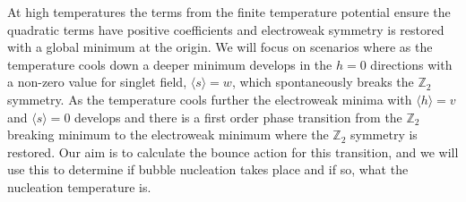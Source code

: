 \documentclass[final,3p,11pt,pdflatex]{elsarticle}
\begin{document}
At high temperatures the terms from the finite temperature potential
ensure the quadratic terms have positive coefficients and electroweak
symmetry is restored with a global minimum at the origin.  We will
focus on scenarios where as the temperature cools down a deeper
minimum develops in the $h=0$ directions with a non-zero value for
singlet field, $\langle s \rangle = w$, which spontaneously breaks the
$\mathbb{Z}_2$ symmetry.  As the temperature cools further the
electroweak minima with $\langle h \rangle =v$ and $\langle s \rangle
=0$ develops and there is a first order phase transition from the
$\mathbb{Z}_2$ breaking minimum to the electroweak minimum where the
$\mathbb{Z}_2$ symmetry is restored.  Our aim is to calculate the
bounce action for this transition, and we will use this to determine if
bubble nucleation takes place and if so, what the nucleation
temperature is.
\end{document}

